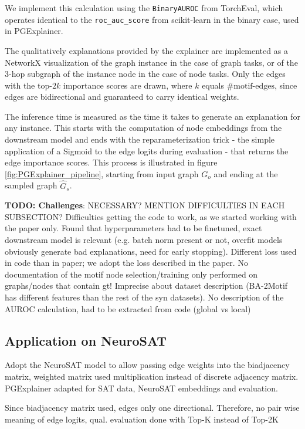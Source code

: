 We implement this calculation using the \verb|BinaryAUROC| from TorchEval, which operates identical to the \verb|roc_auc_score| from scikit-learn \cite{pedregosa2011scikit} in the binary case, used in PGExplainer.

The qualitatively explanations provided by the explainer are implemented as a NetworkX visualization of the graph instance in the case of graph tasks, or of the $3$-hop subgraph of the instance node in the case of node tasks. Only the edges with the top-$2k$ importance scores are drawn, where $k$ equals $\text{\#motif-edges}$, since edges are bidirectional and guaranteed to carry identical weights.

The inference time is measured as the time it takes to generate an explanation for any instance. This starts with the computation of node embeddings from the downstream model and ends with the reparameterization trick - the simple application of a Sigmoid to the edge logits during evaluation - that returns the edge importance scores. This process is illustrated in figure \ref{fig:PGExplainer_pipeline}, starting from input graph $G_o$ and ending at the sampled graph $\hat{G}_s$. \bigskip

\textbf{TODO: Challenges}: NECESSARY? MENTION DIFFICULTIES IN EACH SUBSECTION? Difficulties getting the code to work, as we started working with the paper only. Found that hyperparameters had to be finetuned, exact downstream model is relevant (e.g. batch norm present or not, overfit models obviously generate bad explanations, need for early stopping). Different loss used in code than in paper; we adopt the loss described in the paper. No documentation of the motif node selection/training only performed on graphs/nodes that contain gt! Imprecise about dataset description (BA-2Motif has different features than the rest of the syn datasets). No description of the AUROC calculation, had to be extracted from code (global vs local) \bigskip

\subsection{Application on NeuroSAT}
\label{sec:Application_to_NeuroSAT}
Adopt the NeuroSAT model to allow passing edge weights into the biadjacency matrix, weighted matrix used multiplication instead of discrete adjacency matrix. PGExplainer adapted for SAT data, NeuroSAT embeddings and evaluation.

Since biadjacency matrix used, edges only one directional. Therefore, no pair wise meaning of edge logits, qual. evaluation done with Top-K instead of Top-2K

